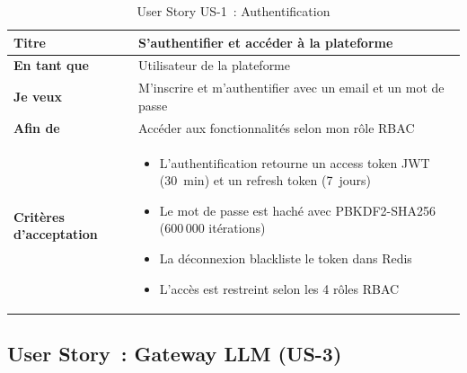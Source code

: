 \begin{table}[H]
\centering
\caption{User Story US-1~: Authentification}
\label{tab:us1}
\begin{tabularx}{\textwidth}{|l|X|}
\hline
\textbf{Titre} & S'authentifier et accéder à la plateforme \\
\hline
\textbf{En tant que} & Utilisateur de la plateforme \\
\hline
\textbf{Je veux} & M'inscrire et m'authentifier avec un email et un mot de passe \\
\hline
\textbf{Afin de} & Accéder aux fonctionnalités selon mon rôle RBAC \\
\hline
\textbf{Critères d'acceptation} & \begin{minipage}[t]{\linewidth}\vspace{2pt}
\begin{itemize}[noitemsep,topsep=0pt]
\item L'authentification retourne un access token JWT (30~min) et un refresh token (7~jours)
\item Le mot de passe est haché avec PBKDF2-SHA256 (600\,000 itérations)
\item La déconnexion blackliste le token dans Redis
\item L'accès est restreint selon les 4 rôles RBAC
\end{itemize}\vspace{2pt}
\end{minipage} \\
\hline
\end{tabularx}
\end{table}


\subsection{User Story~: Gateway LLM (US-3)}

